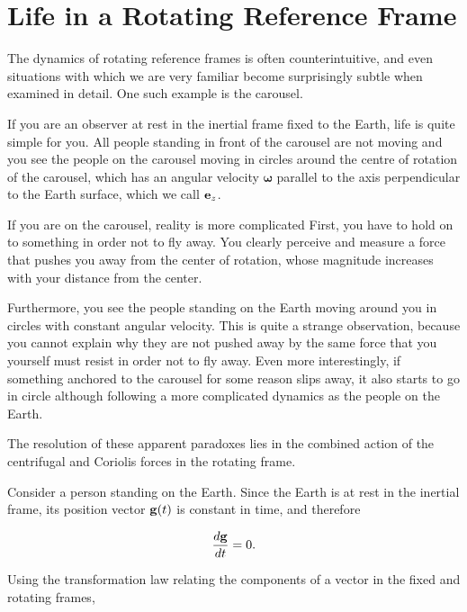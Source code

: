 \documentclass[12pt]{article}
\begin{document}

\section{Life in a Rotating Reference Frame}

The dynamics of rotating reference frames is often counterintuitive, and even situations with which
we are very familiar become surprisingly subtle when examined in detail. One such example is the carousel. \par

If you are an observer at rest in the inertial frame fixed to the Earth, life is quite simple for you. All people standing in front of
the carousel are not moving and you see the people on the carousel moving in circles around the centre of
rotation of the carousel, which has an angular velocity $\boldsymbol{\omega}$ parallel to the axis perpendicular to the Earth
surface, which we call ${\vb e}_z$. \par

If you are on the carousel, reality is more complicated
 First, you have to hold on to something in order not to fly away. You clearly perceive and measure a force that pushes
 you away from the center of rotation, whose magnitude increases with your distance from the center.

Furthermore, you see the people standing on the Earth moving around you in circles with constant angular velocity.
 This is quite a strange observation, because you cannot explain why they are not pushed away by the same force that you yourself must resist in order not to fly away.
  Even more interestingly, if something anchored to the carousel for
some reason slips away, it also starts to go in circle although following a more complicated dynamics as the people on the Earth.\par

The resolution of these apparent paradoxes lies in the combined action of the centrifugal and Coriolis forces in the rotating frame.\par

Consider a person standing on the Earth. Since the Earth is at rest in the
inertial frame, its position vector $\vb g(t)$ is constant in time, and therefore

\[
  \frac{d\vb g}{dt}=0.
\]

Using the transformation law relating the components of a vector in the fixed
and rotating frames,
\end{document}
